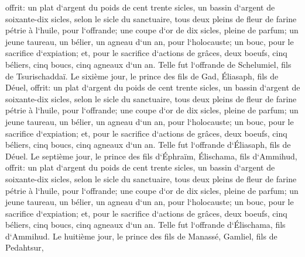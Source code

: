 \verse offrit: un plat d`argent du poids de cent trente sicles, un bassin d`argent de soixante-dix sicles, selon le sicle du sanctuaire, tous deux pleins de fleur de farine pétrie à l`huile, pour l`offrande; 
\verse une coupe d`or de dix sicles, pleine de parfum; 
\verse un jeune taureau, un bélier, un agneau d`un an, pour l`holocauste; 
\verse un bouc, pour le sacrifice d`expiation; 
\verse et, pour le sacrifice d`actions de grâces, deux boeufs, cinq béliers, cinq boucs, cinq agneaux d`un an. Telle fut l`offrande de Schelumiel, fils de Tsurischaddaï. 
\verse Le sixième jour, le prince des fils de Gad, Éliasaph, fils de Déuel, 
\verse offrit: un plat d`argent du poids de cent trente sicles, un bassin d`argent de soixante-dix sicles, selon le sicle du sanctuaire, tous deux pleins de fleur de farine pétrie à l`huile, pour l`offrande; 
\verse une coupe d`or de dix sicles, pleine de parfum; 
\verse un jeune taureau, un bélier, un agneau d`un an, pour l`holocauste; 
\verse un bouc, pour le sacrifice d`expiation; 
\verse et, pour le sacrifice d`actions de grâces, deux boeufs, cinq béliers, cinq boucs, cinq agneaux d`un an. Telle fut l`offrande d`Éliasaph, fils de Déuel. 
\verse Le septième jour, le prince des fils d`Éphraïm, Élischama, fils d`Ammihud, 
\verse offrit: un plat d`argent du poids de cent trente sicles, un bassin d`argent de soixante-dix sicles, selon le sicle du sanctuaire, tous deux pleins de fleur de farine pétrie à l`huile, pour l`offrande; 
\verse une coupe d`or de dix sicles, pleine de parfum; 
\verse un jeune taureau, un bélier, un agneau d`un an, pour l`holocauste; 
\verse un bouc, pour le sacrifice d`expiation; 
\verse et, pour le sacrifice d`actions de grâces, deux boeufs, cinq béliers, cinq boucs, cinq agneaux d`un an. Telle fut l`offrande d`Élischama, fils d`Ammihud. 
\verse Le huitième jour, le prince des fils de Manassé, Gamliel, fils de Pedahtsur, 
